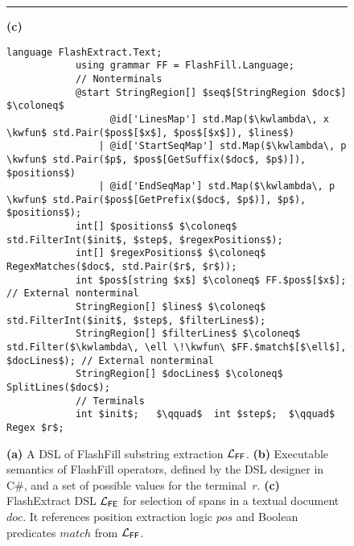 \begin{figure}[p!]
\begin{fullpage}
        \hrule
        \vspace{5pt}
        \hfill\textbf{(c)}
        \vspace{-0.9\baselineskip}
        \begin{lstlisting}[language=dsl,gobble=12,morekeywords={StringRegion,Regex}]
            language FlashExtract.Text;
            using grammar FF = FlashFill.Language;
            // Nonterminals
            @start StringRegion[] $seq$[StringRegion $doc$] $\coloneq$
                  @id['LinesMap'] std.Map($\kwlambda\, x \kwfun$ std.Pair($pos$[$x$], $pos$[$x$]), $lines$)
                | @id['StartSeqMap'] std.Map($\kwlambda\, p \kwfun$ std.Pair($p$, $pos$[GetSuffix($doc$, $p$)]), $positions$)
                | @id['EndSeqMap'] std.Map($\kwlambda\, p \kwfun$ std.Pair($pos$[GetPrefix($doc$, $p$)], $p$), $positions$);
            int[] $positions$ $\coloneq$ std.FilterInt($init$, $step$, $regexPositions$);
            int[] $regexPositions$ $\coloneq$ RegexMatches($doc$, std.Pair($r$, $r$));
            int $pos$[string $x$] $\coloneq$ FF.$pos$[$x$];  // External nonterminal
            StringRegion[] $lines$ $\coloneq$ std.FilterInt($init$, $step$, $filterLines$);
            StringRegion[] $filterLines$ $\coloneq$ std.Filter($\kwlambda\, \ell \!\kwfun\ $FF.$match$[$\ell$], $docLines$); // External nonterminal
            StringRegion[] $docLines$ $\coloneq$ SplitLines($doc$);
            // Terminals
            int $init$;   $\qquad$  int $step$;  $\qquad$  Regex $r$;
        \end{lstlisting}
        \caption{\textbf{(a)} A DSL of FlashFill substring extraction $\mathcal{L}_{\mathsf{FF}}$.
            \textbf{(b)} Executable semantics of FlashFill operators, defined by the DSL designer in C\#, and
            a set of possible values for the terminal~$r$.
            \textbf{(c)}
            FlashExtract DSL $\mathcal{L}_{\mathsf{FE}}$ for selection of spans in a textual document $doc$.
        It references position extraction logic $pos$ and Boolean predicates $match$ from $\mathcal{L}_{\mathsf{FF}}$. }
        \label{fig:dsl:flashfill}
    \end{fullpage}
\end{figure}


